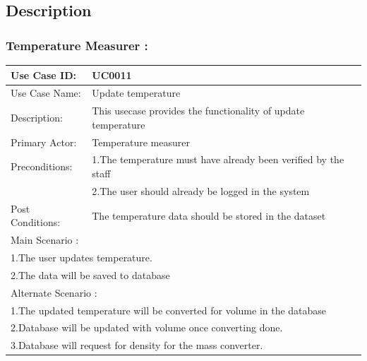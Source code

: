 \nopagebreak

\subsection{Description}
\subsubsection{Temperature Measurer :}
\begin{center}
\vspace*{1\baselineskip}	
\begin{tabular}{|l|p{10cm}|}
	\hline
	Use Case ID: & UC0011 \\
	\hline
	Use Case Name: & Update temperature \\
	\hline
	Description: & This usecase provides the functionality of update temperature \\
	\hline
	Primary Actor: & Temperature measurer \\
	\hline
	Preconditions: & 1.The temperature must have already been verified by the staff\\ 
	& 2.The user should already be logged in the system \\
	\hline
	Post Conditions: & The temperature data should be stored in the dataset\\
	\hline
	\multicolumn{2}{|l|}{Main Scenario :} \\
	\hline
	\multicolumn{2}{|l|}{1.The user updates temperature.} \\
	\multicolumn{2}{|l|}{2.The data will be saved to database } \\
	\hline
	\multicolumn{2}{|l|}{Alternate Scenario :} \\
	\hline
	\multicolumn{2}{|l|}{1.The updated temperature will be converted for volume in the database} \\
	\multicolumn{2}{|l|}{2.Database will be updated with volume once converting done.} \\
	\multicolumn{2}{|l|}{3.Database will request for density for the mass converter.} \\
	\hline
\end{tabular}
\end{center}			


\newpage
